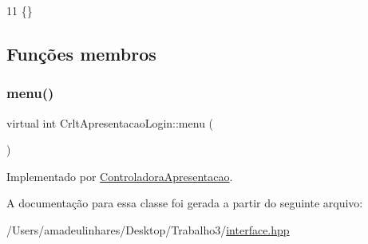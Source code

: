 \begin{DoxyCode}
11 \{\}
\end{DoxyCode}


\subsection{Funções membros}
\mbox{\label{class_crlt_apresentacao_login_a76226b00329c638d6de95458ad87756e}} 
\subsubsection{\texorpdfstring{menu()}{menu()}}
{\footnotesize\ttfamily virtual int Crlt\+Apresentacao\+Login\+::menu (\begin{DoxyParamCaption}{ }\end{DoxyParamCaption})\hspace{0.3cm}{\ttfamily [pure virtual]}}



Implementado por \mbox{\hyperlink{class_controladora_apresentacao_a303849d9fd6785bcbdd5c96fb2413ef3}{Controladora\+Apresentacao}}.



A documentação para essa classe foi gerada a partir do seguinte arquivo\+:\begin{DoxyCompactItemize}
\item 
/\+Users/amadeulinhares/\+Desktop/\+Trabalho3/\mbox{\hyperlink{interface_8hpp}{interface.\+hpp}}\end{DoxyCompactItemize}
